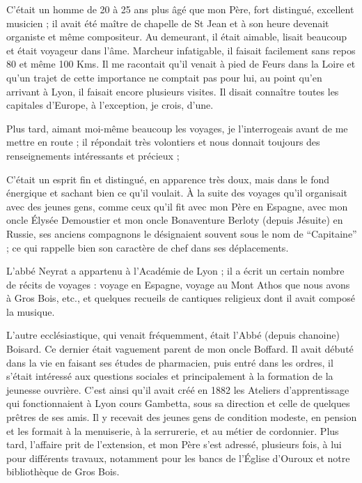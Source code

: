 \documentclass[11pt,a4paper]{report}
\begin{document}
C'était un homme de 20 à 25 ans plus âgé que mon Père, fort distingué, excellent musicien ; il avait été maître de chapelle de St Jean et à son heure devenait organiste et même compositeur. Au demeurant, il était aimable, lisait beaucoup et était voyageur dans l'âme. Marcheur infatigable, il faisait facilement sans repos 80 et même 100 Kms. Il me racontait qu'il venait à pied de Feurs dans la Loire et qu'un trajet de cette importance ne comptait pas pour lui, au point qu'en arrivant à Lyon, il faisait encore plusieurs visites. Il disait connaître toutes les capitales d'Europe, à l'exception, je crois, d'une.

Plus tard, aimant moi-même beaucoup les voyages, je l'interrogeais avant de me mettre en route ; il répondait très volontiers et nous donnait toujours des renseignements intéressants et précieux ;

C'était un esprit fin et distingué, en apparence très doux, mais dans le fond énergique et sachant bien ce qu'il voulait. À la suite des voyages qu'il organisait avec des jeunes gens, comme ceux qu'il fit avec mon Père en Espagne, avec mon oncle Élysée Demoustier et mon oncle Bonaventure Berloty (depuis Jésuite) en Russie, ses anciens compagnons le désignaient souvent sous le nom de ``Capitaine'' ; ce qui rappelle bien son caractère de chef dans ses déplacements.

L'abbé Neyrat a appartenu à l'Académie de Lyon ; il a écrit un certain nombre de récits de voyages : voyage en Espagne, voyage au Mont Athos que nous avons à Gros Bois, etc., et quelques recueils de cantiques religieux dont il avait composé la musique.

L'autre ecclésiastique, qui venait fréquemment, était l'Abbé (depuis chanoine) Boisard. Ce dernier était vaguement parent de mon oncle Boffard. Il avait débuté dans la vie en faisant ses études de pharmacien, puis entré dans les ordres, il s'était intéressé aux questions sociales et principalement à la formation de la jeunesse ouvrière. C'est ainsi qu'il avait créé en 1882 les Ateliers d'apprentissage qui fonctionnaient à Lyon cours Gambetta, sous sa direction et celle de quelques prêtres de ses amis. Il y recevait des jeunes gens de condition modeste, en pension et les formait à la menuiserie, à la serrurerie, et au métier de cordonnier. Plus tard, l'affaire prit de l'extension, et mon Père s'est adressé, plusieurs fois, à lui pour différents travaux, notamment pour les bancs de l'Église d'Ouroux et notre bibliothèque de Gros Bois.
\end{document}
